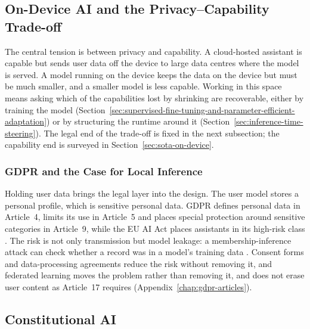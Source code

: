 \subsection{On-Device AI and the Privacy--Capability Trade-off}
\label{sec:on-device-ai-and-the-privacy-capability-trade-off}

The central tension is between privacy and capability. A cloud-hosted assistant is capable but sends user data off the device to large data centres where the model is served. A model running on the device keeps the data on the device but must be much smaller, and a smaller model is less capable. Working in this space means asking which of the capabilities lost by shrinking are recoverable, either by training the model (Section~\ref{sec:supervised-fine-tuning-and-parameter-efficient-adaptation}) or by structuring the runtime around it (Section~\ref{sec:inference-time-steering}). The legal end of the trade-off is fixed in the next subsection; the capability end is surveyed in Section~\ref{sec:sota-on-device}.

\subsubsection{GDPR and the Case for Local Inference}
\label{subsec:gdpr-and-the-case-for-local-inference}

Holding user data brings the legal layer into the design. The user model stores a personal profile, which is sensitive personal data. GDPR defines personal data in Article~4, limits its use in Article~5 and places special protection around sensitive categories in Article~9, while the EU AI Act places assistants in its high-risk class \cite{europeanparliament2024regulationeu20241689}. The risk is not only transmission but model leakage: a membership-inference attack can check whether a record was in a model's training data \cite{shokri2017membershipinferenceattacksmachine}. Consent forms and data-processing agreements reduce the risk without removing it, and federated learning moves the problem rather than removing it, and does not erase user content as Article~17 requires \cite{nguyen2026computationcommunicationefficientfederated, staufer2025llmsforgetquantifyingpersonal} (Appendix~\ref{chap:gdpr-articles}).

\subsection{Constitutional AI}
\label{sec:constitutional-ai}

